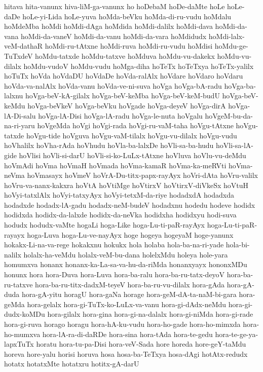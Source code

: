 {hitava
hita-vanunx
hiva-liM-ga-vanunx
ho
hoDebaM
hoDe-daMte
hoLe
hoLe-daDe
hoLe-yi-Lida
hoLe-yuva
hoMda-beVku
hoMda-di-ru-vudu
hoMdalu
hoMdeMba
hoMdi
hoMdi-dAga
hoMdida
hoMdi-dalilx
hoMdi-dava
hoMdi-da-vana
hoMdi-da-vaneV
hoMdi-da-vanu
hoMdi-da-vara
hoMdidudx
hoMdi-lalx-veM-dathaR
hoMdi-ru-tAtxne
hoMdi-ruva
hoMdi-ru-vudu
hoMdisi
hoMdu-ge-TuTxdeV
hoMdu-tatxde
hoMdu-tatxve
hoMduva
hoMdu-vu-dakekx
hoMdu-vu-dilalx
hoMdu-vudoV
hoMdu-vudu
hoMga-diha
hoTeTx
hoTeTxya
hoTeTx-yalilx
hoTuTx
hoVda
hoVdaDU
hoVdaDe
hoVda-ralAlx
hoVdare
hoVdaro
hoVdaru
hoVda-va-nalAlx
hoVda-vanu
hoVda-ve-ni-suva
hoVga
hoVga-bA-radu
hoVga-ba-lalxnu
hoVga-beV-kA-gilalx
hoVga-beV-keMba
hoVga-beV-keM-budU
hoVga-beV-keMdu
hoVga-beVkeV
hoVga-beVku
hoVgade
hoVga-deyeV
hoVga-dirA
hoVga-lA-Di-salu
hoVga-lA-Disi
hoVga-lA-radu
hoVga-le-nuta
hoVgalu
hoVgeM-bu-da-na-ri-yaru
hoVgeMda
hoVgi
hoVgi-rada
hoVgi-ru-vaM-taha
hoVgu-tAtxne
hoVgu-tatxde
hoVgu-tide
hoVguva
hoVgu-vaM-tilalx
hoVgu-vu-dilalx
hoVgu-vudu
hoVhalilx
hoVha-rAda
hoVhudu
hoVla-ba-lalxDe
hoVli-sa-ba-hudu
hoVli-sa-lA-gide
hoVlisi
hoVli-si-darU
hoVli-si-ko-LuLx-tAtxne
hoVluva
hoVlu-vu-deMdu
hoVmAdi
hoVma
hoVmaH
hoVmada
hoVma-kamaR
hoVma-ka-meRVti
hoVma-neVma
hoVmasayx
hoVmeV
hoVrA-Du-titx-papx-rayAyx
hoVri-dAta
hoVru-valilx
hoVru-va-nanx-kakxra
hoVtA
hoVtiMge
hoVtirxV
hoVtirxV-diVkeSx
hoVtuH
hoVyi-tatxlAlx
hoVyi-tatxyAyx
hoVyi-tetxM-da-riye
hodadxdA
hodadxda
hodadxde
hodadx-lA-gadu
hodadx-neM-budeV
hodadxnu
hodedu
hodeve
hodidx
hodidxda
hodidx-da-lalxde
hodidx-da-neVka
hodidxha
hodidxyu
hodi-suva
hodudx
hodudx-vaMte
hogaLi
hoga-Like
hoga-Lu-ti-paR-rayAyx
hoga-Lu-ti-paR-rayayx
hoga-Luva
hoga-Lu-ve-nayAyx
hoge
hogeya
hogeyaM
hoge-yanunx
hokakx-Li-na-va-rege
hokakxnu
hokukx
hola
holaba
hola-ba-na-ri-yade
hola-bi-nalilx
holalx-ha-veMdu
holalx-veM-bu-dana
holelxMdu
holeya
hole-yara
homumxva
honanx
honanx-ka-La-sa-va-hu-da-riMda
honanxyayx
hononxMDu
honunx
hora
hora-Duva
hora-Luva
hora-ba-ralu
hora-ba-ru-tatx-deyoV
hora-ba-ru-tatxve
hora-ba-ru-titx-dadxM-teyeV
hora-ba-ru-vu-dilalx
hora-gAda
hora-gA-duda
hora-gA-yitu
horagU
hora-gaNa
horage
hora-geM-dA-ta-naM-bi-gara
hora-geMda
hora-gelalx
hora-gi-TuTx-ko-LuLx-va-vanu
hora-gi-dAdx-neMdu
hora-gi-dudx-koMDu
hora-gilalx
hora-gina
hora-gi-na-dalalx
hora-gi-niMda
hora-gi-rade
hora-gi-ruva
horago
horagu
hora-hA-ku-vudu
hora-ho-gade
hora-ho-mimxda
hora-ho-mumxva
hora-lA-ra-di-daRDe
hora-sina
hora-tAda
hora-te-gedu
hora-te-ge-ya-lapxTuTx
horatu
hora-tu-pa-Disi
hora-veV-Sada
hore
horeda
hore-geY-taMdu
horeva
hore-yalu
horisi
horuva
hosa
hosa-ba-TeTxya
hosa-dAgi
hotAtx-redudx
hotatx
hotatxMte
hotatxru
hotitx-gA-darU
}
